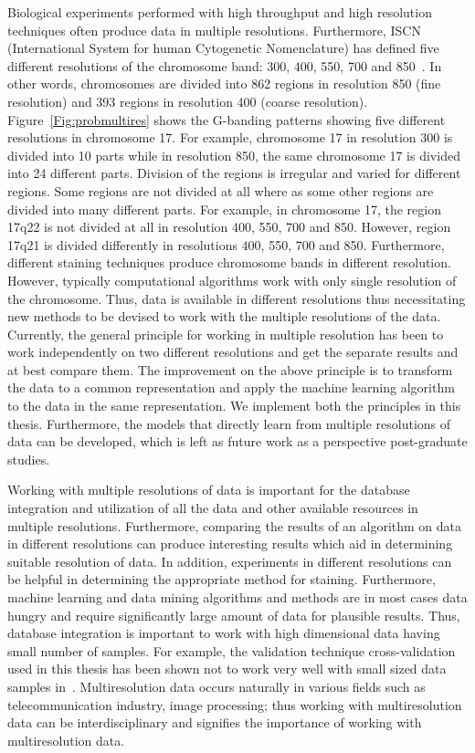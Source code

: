 Biological experiments performed with high throughput and high resolution techniques often produce data in multiple resolutions. Furthermore, ISCN (International System for human Cytogenetic Nomenclature) has defined five different resolutions of the chromosome band: 300, 400, 550, 700 and 850~\cite{iscn}. In other words, chromosomes are divided into 862 regions in resolution 850 (fine resolution) and 393 regions in resolution 400 (coarse resolution). Figure~\ref{Fig:probmultires} shows the G-banding patterns showing five different resolutions in chromosome 17. For example, chromosome 17 in resolution 300 is divided into 10 parts while in resolution 850, the same chromosome 17 is divided into 24 different parts. Division of the regions is irregular and varied for different regions. Some regions are not divided at all where as some other regions are divided into many different parts. For example, in chromosome 17, the region 17q22 is not divided at all in resolution 400, 550, 700 and 850. However, region 17q21 is divided differently in resolutions 400, 550, 700 and 850. Furthermore, different staining techniques produce chromosome bands in different resolution. However, typically computational algorithms work with only single resolution of the chromosome. Thus, data is available in different resolutions thus necessitating new methods to be devised to work with the multiple resolutions of the data. Currently, the general principle for working in multiple resolution has been to work independently on two different resolutions and get the separate results and at best compare them. The improvement on the above principle is to transform the data to a common representation and apply the machine learning algorithm to the data in the same representation. We implement both the principles in this thesis. Furthermore, the models that directly learn from multiple resolutions of data can be developed, which is left as future work as a perspective post-graduate studies.

Working with multiple resolutions of data is important for the database integration and utilization of all the data and other available resources in multiple resolutions. Furthermore, comparing the results of an algorithm on data in different resolutions can produce interesting results which aid in determining suitable resolution of data. In addition, experiments in different resolutions can be helpful in determining the appropriate method for staining. Furthermore, machine learning and data mining algorithms and methods are in most cases data hungry and require significantly large amount of data for plausible results. Thus, database integration is important to work with high dimensional data having small number of samples. For example, the validation technique cross-validation used in this thesis has been shown not to work very well with small sized data samples in~\cite{unreliable, cvinmicroarray}. Multiresolution data occurs naturally in various fields such as telecommunication industry, image processing; thus working with multiresolution data can be interdisciplinary and signifies the importance of working with multiresolution data.

